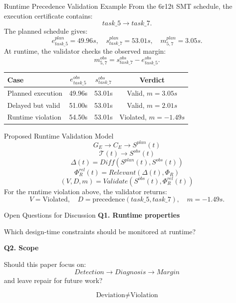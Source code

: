 \documentclass[aspectratio=169]{beamer}
\begin{document}
\begin{frame}{Runtime Precedence Validation Example}
From the 6r12t SMT schedule, the execution certificate contains:
\[
task\_5 \rightarrow task\_7.
\]
The planned schedule gives:
\[
e^{plan}_{task\_5}=49.96s,\quad
s^{plan}_{task\_7}=53.01s,\quad
m^{plan}_{5,7}=3.05s.
\]
At runtime, the validator checks the observed margin:
\[
m^{obs}_{5,7}=s^{obs}_{task\_7}-e^{obs}_{task\_5}.
\]

\scriptsize
\begin{center}
\begin{tabular}{lccc}
\toprule
Case & $e^{obs}_{task\_5}$ & $s^{obs}_{task\_7}$ & Verdict \\
\midrule
Planned execution & 49.96s & 53.01s & Valid, $m=3.05s$ \\
Delayed but valid & 51.00s & 53.01s & Valid, $m=2.01s$ \\
Runtime violation & 54.50s & 53.01s & Violated, $m=-1.49s$ \\
\bottomrule
\end{tabular}
\end{center}
\end{frame}

\begin{frame}{Proposed Runtime Validation Model}
\[
G_E\rightarrow C_E\rightarrow S^{plan}(t)
\]
\[
\mathcal{T}(t)\rightarrow S^{obs}(t)
\]
\[
\Delta(t)=Diff(S^{plan}(t),S^{obs}(t))
\]
\[
\Phi_R^{rel}(t)=Relevant(\Delta(t),\Phi_R)
\]
\[
\boxed{
(V,D,m)=Validate(S^{obs}(t),\Phi_R^{rel}(t))
}
\]
For the runtime violation above, the validator returns:
\[
V=\text{Violated},\quad
D=\text{precedence}(task\_5,task\_7),\quad
m=-1.49s.
\]
\end{frame}

\begin{frame}{Open Questions for Discussion}
\textbf{Q1. Runtime properties}

Which design-time constraints should be monitored at runtime?

\vspace{0.5cm}
\textbf{Q2. Scope}

Should this paper focus on:
\[
Detection\rightarrow Diagnosis\rightarrow Margin
\]
and leave repair for future work?

\[
\boxed{\text{Deviation}\neq\text{Violation}}
\]
\end{frame}
\end{document}
